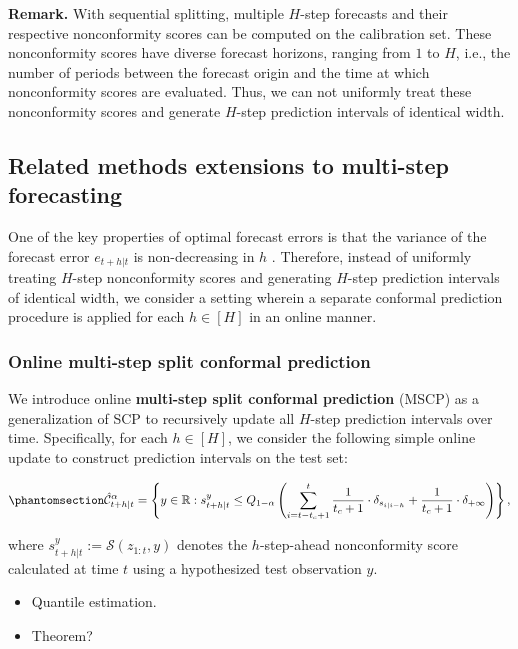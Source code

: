 \documentclass[
  11pt,
  a4paper,
]{article}
\theoremstyle{plain}
\theoremstyle{plain}
\theoremstyle{remark}
\begin{document}
\textbf{Remark.} With sequential splitting, multiple \(H\)-step
forecasts and their respective nonconformity scores can be computed on
the calibration set. These nonconformity scores have diverse forecast
horizons, ranging from \(1\) to \(H\), i.e., the number of periods
between the forecast origin and the time at which nonconformity scores
are evaluated. Thus, we can not uniformly treat these nonconformity
scores and generate \(H\)-step prediction intervals of identical width.

\subsection{Related methods extensions to multi-step
forecasting}\label{sec-ext}

One of the key properties of optimal forecast errors is that the
variance of the forecast error \(e_{t+h|t}\) is non-decreasing in \(h\)
\autocite{diebold1996,patton2007}. Therefore, instead of uniformly
treating \(H\)-step nonconformity scores and generating \(H\)-step
prediction intervals of identical width, we consider a setting wherein a
separate conformal prediction procedure is applied for each
\(h \in [H]\) in an online manner.

\subsubsection{Online multi-step split conformal
prediction}\label{online-multi-step-split-conformal-prediction}

We introduce online \textbf{multi-step split conformal prediction}
(MSCP) as a generalization of SCP to recursively update all \(H\)-step
prediction intervals over time. Specifically, for each \(h \in [H]\), we
consider the following simple online update to construct prediction
intervals on the test set:

\begin{equation}\phantomsection\label{eq-mscp}{
\hat{\mathcal{C}}_{t+h|t}^{\alpha} = \left\{y\in\mathbb{R}: s_{t+h|t}^{y} \leq Q_{1-\alpha}\left(\sum_{i=t-t_c+1}^{t}\frac{1}{t_c+1}\cdot\delta_{s_{i|i-h}}+\frac{1}{t_c+1}\cdot\delta_{+\infty}\right)\right\},
}\end{equation}

where \(s_{t+h|t}^{y}:=\mathcal{S}(z_{1:t}, y)\) denotes the
\(h\)-step-ahead nonconformity score calculated at time \(t\) using a
hypothesized test observation \(y\).

\begin{itemize}
\item
  Quantile estimation.
\item
  Theorem?
\end{itemize}
\end{document}
